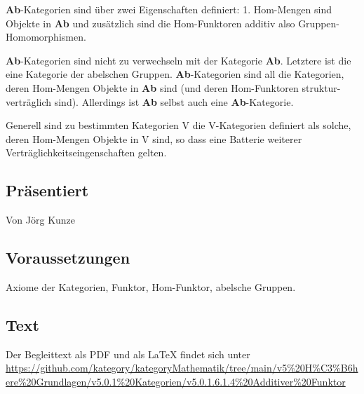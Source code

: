 \documentclass[a4paper]{amsart}
\theoremstyle{definition}
\begin{document}
\textbf{Ab}-Kategorien sind über zwei Eigenschaften definiert: 1. Hom-Mengen sind Objekte in \textbf{Ab} und zusätzlich sind die Hom-Funktoren additiv also Gruppen-Homomorphismen.

\textbf{Ab}-Kategorien sind nicht zu verwechseln mit der Kategorie \textbf{Ab}. Letztere ist die eine Kategorie der abelschen Gruppen. \textbf{Ab}-Kategorien sind all die Kategorien, deren Hom-Mengen Objekte in \textbf{Ab} sind (und deren Hom-Funktoren struktur-verträglich sind). Allerdings ist \textbf{Ab} selbst auch eine \textbf{Ab}-Kategorie.

Generell sind zu bestimmten Kategorien V die V-Kategorien definiert als solche, deren Hom-Mengen Objekte in V sind, so dass eine Batterie weiterer Verträglichkeitseingenschaften gelten.

\subsection*{Präsentiert}
Von Jörg Kunze

\subsection*{Voraussetzungen}
Axiome der Kategorien, Funktor, Hom-Funktor, abelsche Gruppen.

\subsection*{Text}
Der Begleittext als PDF und als LaTeX findet sich unter
{\tiny
   \url{https://github.com/kategory/kategoryMathematik/tree/main/v5%20H%C3%B6here%20Grundlagen/v5.0.1%20Kategorien/v5.0.1.6.1.4%20Additiver%20Funktor}
}

\end{document}

